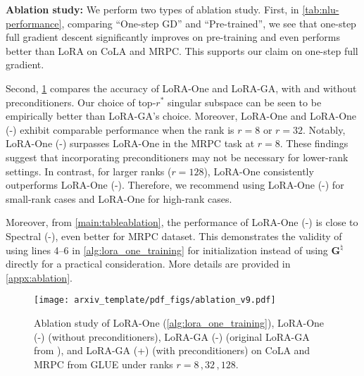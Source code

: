 \noindent
{\bf Ablation study:} We perform two types of ablation study.
First, in \cref{tab:nlu-performance}, comparing ``One-step GD'' and ``Pre-trained'', we see that one-step full gradient descent significantly improves on pre-training and even performs better than LoRA on CoLA and MRPC. This supports our claim on one-step full gradient.

Second, \cref{fig:enter-label} compares the accuracy of LoRA-One and LoRA-GA, with and without preconditioners. 
Our choice of top-$r^*$ singular subspace can be seen to be empirically better than LoRA-GA's choice.  Moreover, LoRA-One and LoRA-One (-) exhibit comparable performance when the rank is  \( r = 8 \) or \( r = 32 \). Notably, LoRA-One (-) surpasses LoRA-One in the MRPC task at \( r = 8 \). These findings suggest that incorporating preconditioners may not be necessary for lower-rank settings. In contrast, for larger ranks (\( r = 128 \)), LoRA-One consistently outperforms LoRA-One (-). Therefore, we recommend using LoRA-One (-) for small-rank cases and LoRA-One for high-rank cases.

Moreover, from \cref{main:tableablation}, the performance of LoRA-One (-) is close to Spectral (-), even better for MRPC dataset. This demonstrates the validity of using lines 4--6 in \cref{alg:lora_one_training} for initialization instead of using $\bm G^\natural$ directly for a practical consideration. More details are provided in \cref{appx:ablation}.

\begin{figure}[ht]
    \centering
    \texttt{[image: arxiv\_template/pdf\_figs/ablation\_v9.pdf]}
    \caption{Ablation study of LoRA-One (\cref{alg:lora_one_training}), LoRA-One (-) (without preconditioners), LoRA-GA (-) (original LoRA-GA from \citealt{wang2024lora}), and LoRA-GA (+) (with preconditioners) on CoLA and MRPC from GLUE \citep{wang2018glue} under ranks $r=8\,,32\,,128$.}
    \label{fig:enter-label}
\end{figure}


